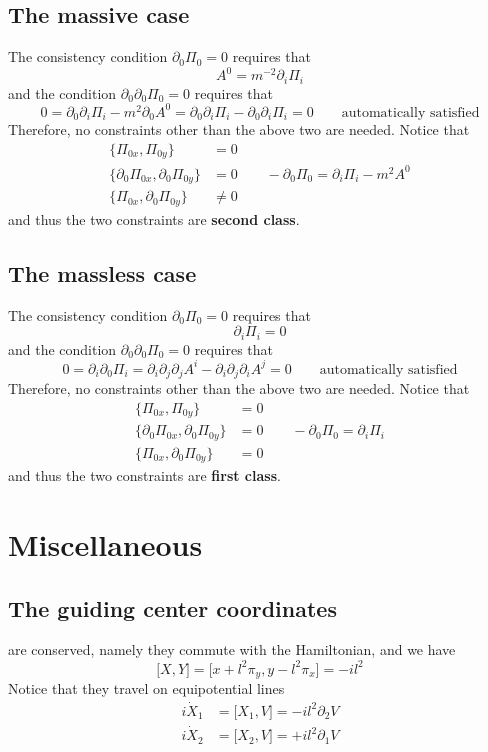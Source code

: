 \documentclass[12pt, oneside]{book}
\begin{document}
\section*{The massive case}
The consistency condition $\partial_0\Pi_0=0$ requires that
\[
A^0=m^{-2}\partial_i\Pi_i
\]
and the condition $\partial_0\partial_0\Pi_0=0$ requires that
\[
0=\partial_0\partial_i\Pi_i-m^2\partial_0A^0=\partial_0\partial_i\Pi_i-\partial_0\partial_i\Pi_i=0\qquad
\text{automatically satisfied}
\]
Therefore, no constraints other than the above two are needed. Notice that
\begin{align*}
\big\{\Pi_{0x},\Pi_{0y}\big\}&=0\\
\big\{\partial_0\Pi_{0x},\partial_0\Pi_{0y}\big\}&=0\qquad
{-}\partial_0\Pi_0=\partial_i\Pi_i-m^2A^0\\
\big\{\Pi_{0x},\partial_0\Pi_{0y}\big\}&\ne0
\end{align*}
and thus the two constraints are \textbf{second class}.

\section*{The massless case}
The consistency condition $\partial_0\Pi_0=0$ requires that
\[
\partial_i\Pi_i=0
\]
and the condition $\partial_0\partial_0\Pi_0=0$ requires that
\[
0=\partial_i\partial_0\Pi_i=\partial_i\partial_j\partial_jA^i-\partial_i\partial_j\partial_iA^j=0\qquad
\text{automatically satisfied}
\]
Therefore, no constraints other than the above two are needed. Notice that
\begin{align*}
\big\{\Pi_{0x},\Pi_{0y}\big\}&=0\\
\big\{\partial_0\Pi_{0x},\partial_0\Pi_{0y}\big\}&=0\qquad
{-}\partial_0\Pi_0=\partial_i\Pi_i\\
\big\{\Pi_{0x},\partial_0\Pi_{0y}\big\}&=0
\end{align*}
and thus the two constraints are \textbf{first class}.

\chapter{Miscellaneous}
\section*{The guiding center coordinates}
are conserved, namely they commute with the Hamiltonian, and we have
\[
\big[X,Y\big]=\big[x+l^2\pi_y,y-l^2\pi_x\big]=-il^2
\]
Notice that they travel on equipotential lines
\begin{align*}
i\dot{X}_1&=\big[X_1,V\big]=-il^2\partial_2V\\
i\dot{X}_2&=\big[X_2,V\big]=+il^2\partial_1V
\end{align*}
\end{document}
